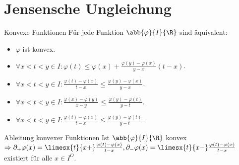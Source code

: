 \section*{Jensensche Ungleichung}

\begin{karte}{Konvexe Funktionen}
	Für jede Funktion \( \abb{\varphi}{I}{\R} \) sind äquivalent: 
	\begin{itemize}
		\item \( \varphi \) ist konvex.
		\item \( \forall x < t < y\in I: \varphi(t) \leq \varphi(x) + \frac{\varphi(y) - \varphi(x)}{y - x}(t - x) \).
		\item \( \forall x < t < y \in I: 
		\frac{\varphi(t) - \varphi(x)}{t - x} \leq \frac{\varphi(y) - \varphi(x)}{y - x} \).
		\item \( \forall x < t < y \in I: 
		\frac{\varphi(x) - \varphi(y)}{x - y} 
		\leq \frac{\varphi(y) - \varphi(t)}{y - t} \).
		\item \( \forall x < t < y \in I: 
		\frac{\varphi(t) - \varphi(x)}{t - x} 
		\leq \frac{\varphi(y) - \varphi(t)}{y - t} \).
	\end{itemize}
\end{karte}

\begin{karte}{Ableitung konvexer Funktionen}
	Ist \( \abb{\varphi}{I}{\R} \) konvex 
	\(\Rightarrow \partial_+ \varphi(x) = \limesx{t}{x+} \frac{\varphi(t) - \varphi(x)}{t - x}, 
	\partial_- \varphi(x) = \limesx{t}{x-} \frac{\varphi(t) - \varphi(x)}{t - x} \)
	existiert für alle \( x\in I^O \).
\end{karte}
